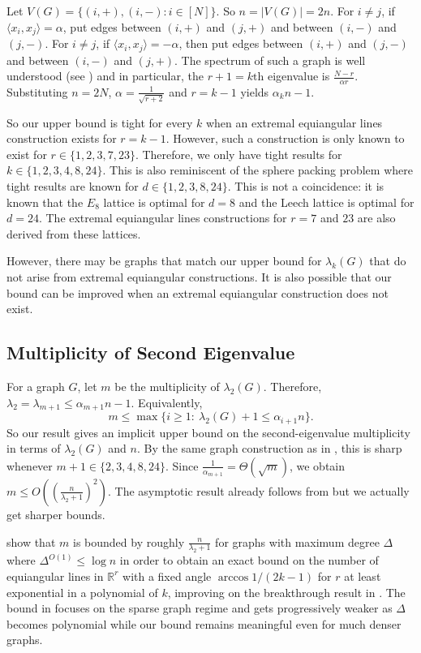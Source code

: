 \documentclass[12pt]{amsart}
\theoremstyle{myremark}
\newcommand{\R}{\mathbb{R}}
\newcommand{\1}{\mathbf{1}}
\newcommand{\inner}[2]{\langle #1,#2\rangle}
\begin{document}
Let $V(G) = \{(i,+),(i,-): i \in [N]\}$. So $n = |V(G)| = 2n$. For $i \neq j$, if $\inner{x_i}{x_j} = \alpha$, put edges between $(i,+)$ and $(j,+)$ and between $(i,-)$ and $(j,-)$. For $i \neq j$, if $\inner{x_i}{x_j} = -\alpha$, then put edges between $(i,+)$ and $(j,-)$ and between $(i,-)$ and $(j,+)$. The spectrum of such a graph is well understood (see \cite{GodsilHensel1992}) and in particular, the $r+1 = k\text{th}$ eigenvalue is $\frac{N-r}{\alpha r}$. Substituting $n = 2N$, $\alpha = \frac{1}{\sqrt{r+2}}$ and $r = k-1$ yields $\alpha_k n - 1$. 

So our upper bound is tight for every $k$ when an extremal equiangular lines construction exists for $r = k-1$. However, such a construction is only known to exist for $r\in \{1,2,3,7,23\}$. Therefore, we only have tight results for $k \in \{1,2,3,4,8,24\}$. This is also reminiscent of the sphere packing problem where tight results are known for $d \in \{1,2,3,8,24\}$. This is not a coincidence: it is known that the $E_8$ lattice is optimal for $d = 8$\cite{viazovska2017sphere} and the Leech lattice is optimal for $d=24$\cite{cohn2017sphere}. The extremal equiangular lines constructions for $r=7$ and $23$ are also derived from these lattices\cite{gillespie2018equiangular}.

However, there may be graphs that match our upper bound for $\lambda_k(G)$ that do not arise from extremal equiangular constructions. It is also possible that our bound can be improved when an extremal equiangular construction does not exist. 

\subsection{Multiplicity of Second Eigenvalue}
For a graph $G$, let $m$ be the multiplicity of $\lambda_2(G)$. Therefore, $\lambda_2 = \lambda_{m+1} \leq \alpha_{m+1} n - 1$. 
Equivalently,
\[
m \le \max\bigl\{i\ge 1:\ \lambda_2(G)+1\le \alpha_{i+1}n\bigr\}.
\]
So our result gives an implicit upper bound on the second-eigenvalue multiplicity in terms of \(\lambda_2(G)\) and \(n\). By the same graph construction as in , this is sharp whenever $m+1 \in \{2,3,4,8,24\}$. Since $\frac{1}{\alpha_{m+1}} = \Theta(\sqrt{m})$, we obtain $m \leq O((\frac{n}{\lambda_2 + 1})^2)$. The asymptotic result already follows from \cite{Nikiforov15} but we actually get sharper bounds. 

\cite{balla2024equiangular} show that $m$ is bounded by roughly $\frac{n}{\lambda_2 + 1}$ for graphs with maximum degree $\Delta$ where $\Delta^{O(1)} \leq \log n$ in order to obtain an exact bound on the number of equiangular lines in $\R^r$ with a fixed angle $\arccos{1/(2k-1)}$ for $r$ at least exponential in a polynomial of $k$, improving on the breakthrough result in \cite{jiang2021equiangular}. The bound in \cite{balla2024equiangular} focuses on the sparse graph regime and gets progressively weaker as $\Delta$ becomes polynomial while our bound remains meaningful even for much denser graphs. 
\end{document}
